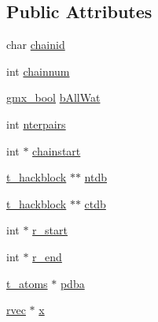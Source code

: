 \subsection*{\-Public \-Attributes}
\begin{DoxyCompactItemize}
\item 
char \hyperlink{structt__chain_a90cc899e9b199e8f9277cdde39dc0143}{chainid}
\item 
int \hyperlink{structt__chain_a3f13bd2462df658afdf568ed9233168f}{chainnum}
\item 
\hyperlink{include_2types_2simple_8h_a8fddad319f226e856400d190198d5151}{gmx\-\_\-bool} \hyperlink{structt__chain_a4588a56096065fad0233a3c62b7520d8}{b\-All\-Wat}
\item 
int \hyperlink{structt__chain_a75f29567fd1b723c07298a4ee64852b9}{nterpairs}
\item 
int $\ast$ \hyperlink{structt__chain_a81448ac98b4276fcef4e54ea5fb5f44d}{chainstart}
\item 
\hyperlink{structt__hackblock}{t\-\_\-hackblock} $\ast$$\ast$ \hyperlink{structt__chain_afd407f62aaa7357100b0b78c727f8a56}{ntdb}
\item 
\hyperlink{structt__hackblock}{t\-\_\-hackblock} $\ast$$\ast$ \hyperlink{structt__chain_a09dd880b5c8387c41f33c21a6be7b0da}{ctdb}
\item 
int $\ast$ \hyperlink{structt__chain_af86259dae09b297b0587d7eff4e633b7}{r\-\_\-start}
\item 
int $\ast$ \hyperlink{structt__chain_a18e2c59ffed85780b50e23e1a7b843a9}{r\-\_\-end}
\item 
\hyperlink{structt__atoms}{t\-\_\-atoms} $\ast$ \hyperlink{structt__chain_ad8097c9e0941737f3e186223f5333b08}{pdba}
\item 
\hyperlink{share_2template_2gromacs_2types_2simple_8h_aa02a552a4abd2f180c282a083dc3a999}{rvec} $\ast$ \hyperlink{structt__chain_a0061c01a06b1ee38d4c55092c20469ae}{x}
\end{DoxyCompactItemize}


